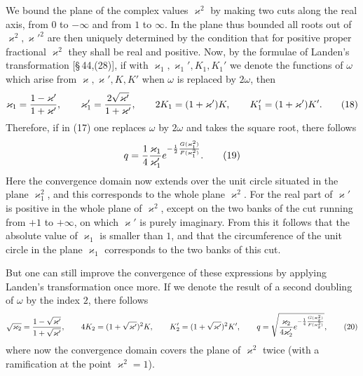 \documentclass[11pt]{article}
\begin{document}
We bound the plane of the complex values $\varkappa^2$ by making two cuts along the real axis, from $0$ to $-\infty$ and from $1$ to $\infty$. In the plane thus bounded all roots out of $\varkappa^2,\varkappa'^2$ are then uniquely determined by the condition that for positive proper fractional $\varkappa^2$ they shall be real and positive. Now, by the formulae of Landen's transformation [\S\,44,(28)], if with $\varkappa_1,\varkappa_1',K_1,K_1'$ we denote the functions of $\omega$ which arise from $\varkappa,\varkappa',K,K'$ when $\omega$ is replaced by $2\omega$, then
\begin{equation}
\varkappa_1={1-\varkappa'\over1+\varkappa'},
\qquad
\varkappa_1'={2\sqrt{\varkappa'}\over1+\varkappa'},
\qquad
2K_1=(1+\varkappa')K,
\qquad
K_1'=(1+\varkappa')K'.
\tag{18}
\end{equation}
Therefore, if in (17) one replaces $\omega$ by $2\omega$ and takes the square root, there follows
\begin{equation}
q={1\over4}{\varkappa_1\over\varkappa_1'}
 e^{-{1\over2}{G(\varkappa_1^2)\over F(\varkappa_1^2)}}.
\tag{19}
\end{equation}
Here the convergence domain now extends over the unit circle situated in the plane $\varkappa_1^2$, and this corresponds to the whole plane $\varkappa^2$. For the real part of $\varkappa'$ is positive in the whole plane of $\varkappa^2$, except on the two banks of the cut running from $+1$ to $+\infty$, on which $\varkappa'$ is purely imaginary. From this it follows that the absolute value of $\varkappa_1$ is smaller than $1$, and that the circumference of the unit circle in the plane $\varkappa_1$ corresponds to the two banks of this cut.

But one can still improve the convergence of these expressions by applying Landen's transformation once more. If we denote the result of a second doubling of $\omega$ by the index $2$, there follows
\begin{equation}
\sqrt{\varkappa_2}={1-\sqrt{\varkappa'}\over1+\sqrt{\varkappa'}},
\qquad
4K_2=(1+\sqrt{\varkappa'})^2K,
\qquad
K_2'=(1+\sqrt{\varkappa'})^2K',
\qquad
q=\sqrt{{\varkappa_2\over4\varkappa_2'}e^{-{1\over4}{G(\varkappa_2^2)\over F(\varkappa_2^2)}}},
\tag{20}
\end{equation}
where now the convergence domain covers the plane of $\varkappa^2$ twice (with a ramification at the point $\varkappa^2=1$).
\end{document}
